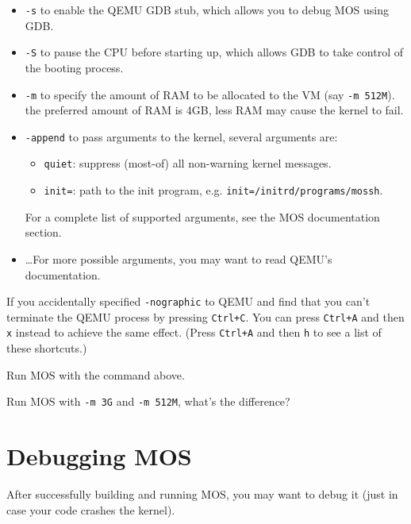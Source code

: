 \begin{itemize}
    \item \texttt{-s} to enable the QEMU GDB stub, which allows you to debug MOS using GDB.
    \item \texttt{-S} to pause the CPU before starting up, which allows GDB to take control of
          the booting process.
    \item \texttt{-m} to specify the amount of RAM to be allocated to the VM (say \texttt{-m 512M}).
          the preferred amount of RAM is 4GB, less RAM may cause the kernel to fail.
    \item \texttt{-append} to pass arguments to the kernel, several arguments are:
          \begin{itemize}
              \item \texttt{quiet}: suppress (most-of) all non-warning kernel messages.
              \item \texttt{init=}: path to the init program, e.g. \texttt{init=/initrd/programs/mossh}.
          \end{itemize}
          For a complete list of supported arguments, see the MOS documentation section.
    \item \dots For more possible arguments, you may want to read QEMU's documentation.
\end{itemize}

\begin{tip}
    \item If you accidentally specified \texttt{-nographic} to QEMU and find that you can't terminate
    the QEMU process by pressing \texttt{Ctrl+C}. You can press \texttt{Ctrl+A} and then \texttt{x}
    instead to achieve the same effect. (Press \texttt{Ctrl+A} and then \texttt{h} to see a list of these
    shortcuts.)
\end{tip}

\begin{exercise}
    \item Run MOS with the command above.
    \item Run MOS with \texttt{-m 3G} and \texttt{-m 512M}, what's the difference?
\end{exercise}

\section{Debugging MOS}

After successfully building and running MOS, you may want to debug it (just in case your code crashes
the kernel).

